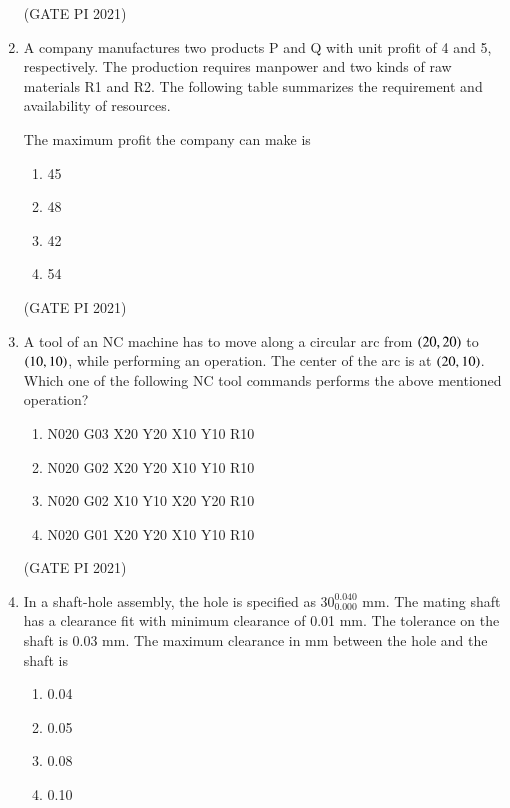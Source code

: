 \documentclass[journal,12pt,onecolumn]{IEEEtran}
\theoremstyle{remark}
\begin{document}
\begin{enumerate}
\hfill (GATE PI 2021)

\item
A company manufactures two products P and Q with unit profit of 4 and 5, respectively. The production requires manpower and two kinds of raw materials R1 and R2. The following table summarizes the requirement and availability of resources.



The maximum profit the company can make is

\begin{multicols}{4}
\begin{enumerate}
\item 45
\item 48
\item 42
\item 54
\end{enumerate}
\end{multicols}

\hfill (GATE PI 2021)

\item
A tool of an NC machine has to move along a circular arc from $\left(20,20\right)$ to $\left(10,10\right)$, while performing an operation. The center of the arc is at $\left(20,10\right)$. Which one of the following NC tool commands performs the above mentioned operation?

\begin{enumerate}
\item N020 G03 X20 Y20 X10 Y10 R10
\item N020 G02 X20 Y20 X10 Y10 R10
\item N020 G02 X10 Y10 X20 Y20 R10
\item N020 G01 X20 Y20 X10 Y10 R10
\end{enumerate}

\hfill (GATE PI 2021)

\item
In a shaft-hole assembly, the hole is specified as $30^{0.040}_{0.000}$ mm. The mating shaft has a clearance fit with minimum clearance of 0.01 mm. The tolerance on the shaft is 0.03 mm. The maximum clearance in mm between the hole and the shaft is

\begin{multicols}{4}
\begin{enumerate}
\item 0.04
\item 0.05
\item 0.08
\item 0.10
\end{enumerate}
\end{multicols}


\end{enumerate}
\end{document}
